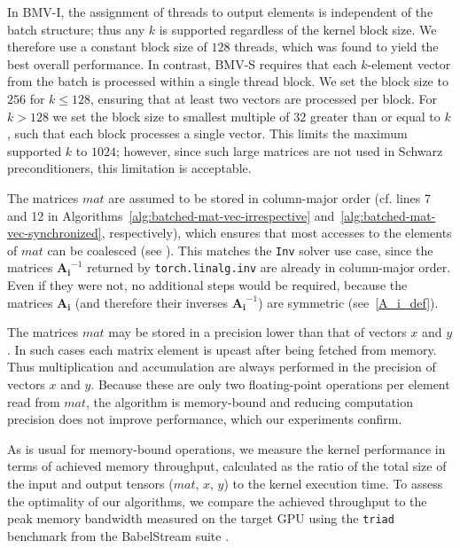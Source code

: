 \documentclass[11pt]{article}
\theoremstyle{definition}
\theoremstyle{theorem}
\begin{document}
In BMV-I, the assignment of threads to output elements is independent of the batch
structure; thus any $k$ is supported regardless of the kernel block size.
We therefore use a constant block size of $128$ threads, which
was found to yield the best overall performance. In contrast, BMV-S requires
that each $k$-element vector from the batch is processed within a single thread block.
We set the block size to $256$ for $k\leq 128$, ensuring that at least two vectors
are processed per block. For $k>128$ we set the block size to smallest multiple of $32$
greater than or equal to $k$, such that each block processes a single vector.
This limits the maximum supported $k$ to $1024$; however, since such large matrices
are not used in Schwarz preconditioners, this limitation is acceptable.

The matrices $mat$ are assumed to be
stored in column-major order (cf. lines 7 and 12 in
Algorithms~\ref{alg:batched-mat-vec-irrespective} and~\ref{alg:batched-mat-vec-synchronized},
respectively), which ensures that most accesses to the
elements of $mat$ can be coalesced (see \cite[Section 5.3.2]{cuda-guide}). This
matches the \verb|Inv| solver use case, since the matrices $\bm{A_i}^{-1}$
returned by \verb|torch.linalg.inv| are already in column-major order.
Even if they were not, no additional steps would be required, because the matrices $\bm{A_i}$
(and therefore their inverses $\bm{A_i}^{-1}$) are symmetric (see~\eqref{A_i_def}).

The matrices $mat$ may be stored in a precision lower than that of vectors $x$ and $y$.
In such cases each matrix element is upcast after being
fetched from memory. Thus multiplication
and accumulation are always performed in the precision of vectors $x$ and $y$.
Because these are only two floating\nobreakdash-point operations per element read from $mat$,
the algorithm is memory-bound and reducing computation precision does not
improve performance, which our experiments confirm.

As is usual for memory-bound operations, we measure the kernel performance
in terms of achieved memory throughput, calculated
as the ratio of the total size of the input and output tensors ($mat$, $x$, $y$)
to the kernel execution time.
To assess the optimality of our algorithms, we compare the achieved throughput
to the peak memory bandwidth measured on the target GPU using the
\verb|triad| benchmark from the BabelStream suite \cite{babelstream}.
\end{document}
